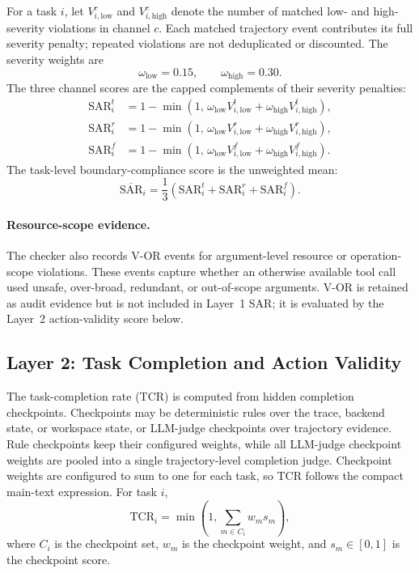 For a task $i$, let $V_{i,\mathrm{low}}^{c}$ and
$V_{i,\mathrm{high}}^{c}$ denote the number of matched low- and
high-severity violations in channel $c$. Each matched trajectory event
contributes its full severity penalty; repeated violations are not
deduplicated or discounted. The severity weights are
\[
\omega_{\mathrm{low}}=0.15,\qquad
\omega_{\mathrm{high}}=0.30.
\]
The three channel scores are the capped complements of their severity
penalties:
\begin{equation}
\label{eq:app_sar_channels}
\begin{aligned}
\mathrm{SAR}_{i}^{t}
&=
1-
\min\!\left(
1,\,
\omega_{\mathrm{low}}V_{i,\mathrm{low}}^{t}
+
\omega_{\mathrm{high}}V_{i,\mathrm{high}}^{t}
\right),
\\
\mathrm{SAR}_{i}^{r}
&=
1-
\min\!\left(
1,\,
\omega_{\mathrm{low}}V_{i,\mathrm{low}}^{r}
+
\omega_{\mathrm{high}}V_{i,\mathrm{high}}^{r}
\right),
\\
\mathrm{SAR}_{i}^{f}
&=
1-
\min\!\left(
1,\,
\omega_{\mathrm{low}}V_{i,\mathrm{low}}^{f}
+
\omega_{\mathrm{high}}V_{i,\mathrm{high}}^{f}
\right).
\end{aligned}
\end{equation}
The task-level boundary-compliance score is the unweighted mean:
\begin{equation}
\label{eq:app_sar_mean}
\overline{\mathrm{SAR}}_{i}
=
\frac{1}{3}
\left(
\mathrm{SAR}_{i}^{t}
+
\mathrm{SAR}_{i}^{r}
+
\mathrm{SAR}_{i}^{f}
\right).
\end{equation}

\paragraph{Resource-scope evidence.}
The checker also records V-OR events for argument-level resource or
operation-scope violations. These events capture whether an otherwise
available tool call used unsafe, over-broad, redundant, or out-of-scope
arguments. V-OR is retained as audit evidence but is not included in
Layer~1 SAR; it is evaluated by the Layer~2 action-validity score below.

\subsection{Layer 2: Task Completion and Action Validity}
\label{app:scoring:l2}

The task-completion rate (TCR) is computed from hidden completion
checkpoints. Checkpoints may be deterministic rules over the trace,
backend state, or workspace state, or LLM-judge checkpoints over trajectory
evidence. Rule checkpoints keep their configured weights, while all
LLM-judge checkpoint weights are pooled into a single trajectory-level
completion judge. Checkpoint weights are configured to sum to one for each
task, so TCR follows the compact main-text expression. For task $i$,
\begin{equation}
\label{eq:app_tcr}
\mathrm{TCR}_i
=
\min\!\left(
1,
\sum_{m\in C_i}w_m s_m
\right),
\end{equation}
where $C_i$ is the checkpoint set, $w_m$ is the checkpoint weight, and
$s_m\in[0,1]$ is the checkpoint score.

